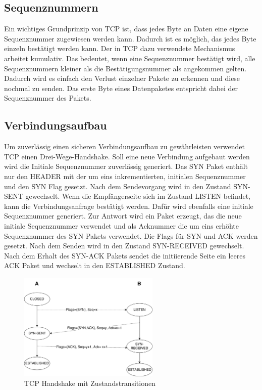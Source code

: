 \subsection{Sequenznummern}
Ein wichtiges Grundprinzip von TCP ist, dass jedes Byte an Daten eine eigene Sequenznummer zugewiesen werden kann. Dadurch ist es möglich, das jedes Byte einzeln bestätigt werden kann. Der in TCP dazu verwendete Mechanismus arbeitet kumulativ. Das bedeutet, wenn eine Sequenznummer bestätigt wird, alle Sequenznummern kleiner als die Bestätigungsnummer als angekommen gelten. Dadurch wird es einfach den Verlust einzelner Pakete zu erkennen und diese nochmal zu senden. Das erste Byte eines Datenpaketes entspricht dabei der Sequenznummer des Pakets. 

\subsection{Verbindungsaufbau}
Um zuverlässig einen sicheren Verbindungsaufbau zu gewährleisten verwendet TCP einen Drei-Wege-Handshake. Soll eine neue Verbindung aufgebaut werden wird die Initiale Sequenznummer zuverlässig generiert. Das SYN Paket enthält nur den HEADER mit der um eins inkrementierten, initialen Sequenznummer und den SYN Flag gesetzt. Nach dem Sendevorgang wird in den Zustand SYN-SENT gewechselt. Wenn die Empfängerseite sich im Zustand LISTEN befindet, kann die Verbindungsanfrage bestätigt werden. Dafür wird ebenfalls eine initiale Sequenznummer generiert. Zur Antwort wird ein Paket erzeugt, das die neue initiale Sequenznummer verwendet und als Acknummer die um eins erhöhte Sequenznummer des SYN Pakets verwendet. Die Flags für SYN und ACK werden gesetzt. Nach dem Senden wird in den Zustand SYN-RECEIVED gewechselt.\\
Nach dem Erhalt des SYN-ACK Pakets sendet die initiierende Seite ein leeres ACK Paket und wechselt in den ESTABLISHED Zustand. 

\begin{figure}[h]
	\centering
	\includegraphics[width=0.6\textwidth]{Graphics/tcp_Handshake.png}
	\caption{TCP Handshake mit Zustandstransitionen}
\end{figure}
\FloatBarrier
